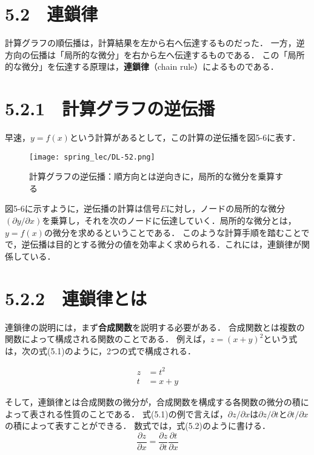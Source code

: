 \documentclass[dvipdfmx]{jsarticle}
\begin{document}
\section*{5.2　連鎖律}
計算グラフの順伝播は，計算結果を左から右へ伝達するものだった．
一方，逆方向の伝播は「局所的な微分」を右から左へ伝達するものである．
この「局所的な微分」を伝達する原理は，\textbf{連鎖律}（chain rule）によるものである．


\section*{5.2.1　計算グラフの逆伝播}
早速，$y = f(x)$という計算があるとして，この計算の逆伝播を図5-6に表す．

\begin{figure}[htbp]
    \begin{center}
    \texttt{[image: spring\_lec/DL-52.png]}
    \end{center}
    \caption{計算グラフの逆伝播：順方向とは逆向きに，局所的な微分を乗算する}
\end{figure}


図5-6に示すように，逆伝播の計算は信号$E$に対し，ノードの局所的な微分$(\partial y/\partial x)$を乗算し，それを次のノードに伝達していく．局所的な微分とは，$y = f(x)$の微分を求めるということである．
このような計算手順を踏むことでで，逆伝播は目的とする微分の値を効率よく求められる．これには，連鎖律が関係している．

\section*{5.2.2　連鎖律とは}
連鎖律の説明には，まず\textbf{合成関数}を説明する必要がある．
合成関数とは複数の関数によって構成される関数のことである．
例えば，$z = (x + y)^2$という式は，次の式(5.1)のように，2つの式で構成される．

\begin{align*}
z &= t^2 \\
t &= x + y
\tag{5.1}
\end{align*}

そして，連鎖律とは合成関数の微分が，合成関数を構成する各関数の微分の積によって表される性質のことである．
式(5.1)の例で言えば，$\partial z/ \partial x$は$\partial z/ \partial t$と$\partial t/ \partial x$の積によって表すことができる．
数式では，式(5.2)のように書ける．
\begin{equation}
    \frac{\partial z}{\partial x} = \frac{\partial z}{\partial t} \frac{\partial t}{\partial x}
\tag{5.2}
\end{equation}
\end{document}
